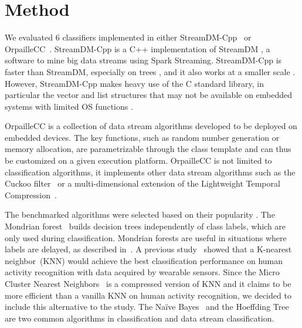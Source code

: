 \section{Method}
We evaluated 6 classifiers implemented in
either StreamDM-Cpp~\cite{streamDM} or
OrpailleCC~\cite{OrpailleCC}.  StreamDM-Cpp is a
C++ implementation of StreamDM , a
software to mine big data streams using Spark
Streaming. StreamDM-Cpp is faster than
StreamDM, especially on trees , and it also works at a
smaller scale . However, StreamDM-Cpp makes heavy
use of the C standard library, in particular the vector and
list structures that may not be available on embedded systems
with limited OS functions .

OrpailleCC is a
collection of data stream algorithms developed to
be deployed on embedded devices. The key
functions, such as random number generation or memory allocation, are
parametrizable through the class template and can thus be customized 
on a given execution platform.
OrpailleCC is not limited to classification
algorithms, it implements other data stream
algorithms such as the Cuckoo filter~\cite{cuckoo}
or a multi-dimensional extension of the
Lightweight Temporal Compression~\cite{multi-ltc}.

The benchmarked algorithms were selected based on their popularity .
The Mondrian forest~\cite{mondrian2014} builds decision trees
independently of class labels, which are only used during classification. Mondrian forests
 are useful in situations where
labels are delayed, as described
in~\cite{stream_learning_review}.  A previous
study~\cite{Janidarmian_2017} showed that a
K-nearest neighbor~(KNN) would achieve the best
classification performance on human activity
recognition with data acquired by wearable
sensors. Since the Micro Cluster Nearest
Neighbors~\cite{mc-nn} is a compressed version of
KNN and it claims to be more efficient than a
vanilla KNN on human activity recognition, we decided
to include this alternative to the study.  The
Naïve Bayes~\cite{naive_bayes} and the Hoeffding
Tree~\cite{VFDT} are two common algorithms in
classification and data stream classification.

